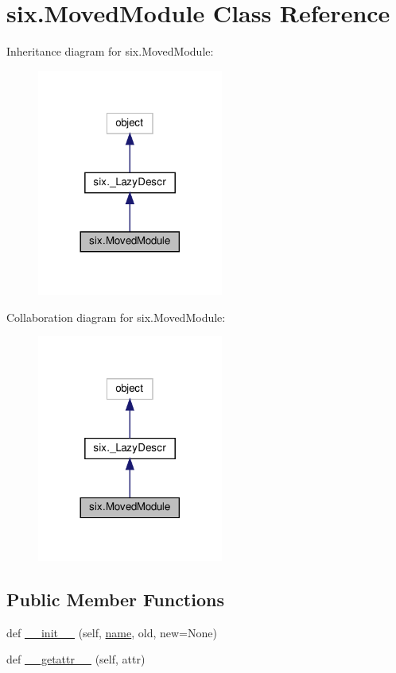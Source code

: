\hypertarget{classsix_1_1MovedModule}{}\section{six.\+Moved\+Module Class Reference}
\label{classsix_1_1MovedModule}


Inheritance diagram for six.\+Moved\+Module\+:
\nopagebreak
\begin{figure}[H]
\begin{center}
\leavevmode
\includegraphics[width=173pt]{classsix_1_1MovedModule__inherit__graph}
\end{center}
\end{figure}


Collaboration diagram for six.\+Moved\+Module\+:
\nopagebreak
\begin{figure}[H]
\begin{center}
\leavevmode
\includegraphics[width=173pt]{classsix_1_1MovedModule__coll__graph}
\end{center}
\end{figure}
\subsection*{Public Member Functions}
\begin{DoxyCompactItemize}
\item 
def \hyperlink{classsix_1_1MovedModule_a72f33b603c6902f008c2f067b9096268}{\+\_\+\+\_\+init\+\_\+\+\_\+} (self, \hyperlink{classsix_1_1__LazyDescr_ad45b705c0f4b63da8bcd1311527b2591}{name}, old, new=None)
\item 
def \hyperlink{classsix_1_1MovedModule_a4ae5456b2eacd57cc5440f3cf9a2276b}{\+\_\+\+\_\+getattr\+\_\+\+\_\+} (self, attr)
\end{DoxyCompactItemize}
